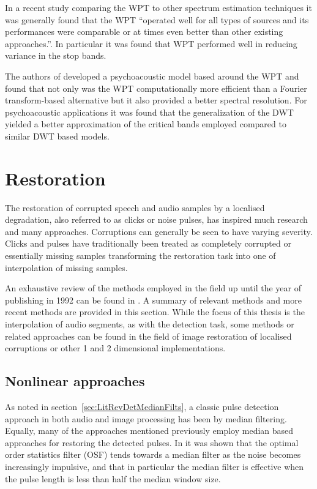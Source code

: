 In a recent study comparing the WPT to other spectrum estimation techniques it was generally found that the WPT ``operated well for all types of sources and its performances were comparable or at times even better than other existing \linebreak[0]approaches.''\cite{Ariananda2013}. In particular it was found that WPT performed well in reducing variance in the stop bands.

The authors of \cite{He2008} developed a psychoacoustic model based around the WPT and found that not only was the WPT computationally more efficient than a Fourier transform-based alternative but it also provided a better spectral resolution. For psychoacoustic applications it was found that the generalization of the DWT yielded a better approximation of the critical bands employed\cite{Carnero1999}\cite{He2008} compared to similar DWT based models\cite{Sinha1993}\cite{Zurera2001}.

\section{Restoration}\label{sec:LitRev_Restoration}
The restoration of corrupted speech and audio samples by a localised degradation, also referred to as clicks or noise pulses, has inspired much research and many approaches. Corruptions can generally be seen to have varying severity. Clicks and pulses have traditionally been treated as completely corrupted or essentially missing samples transforming the restoration task into one of interpolation of missing samples\cite{Tukey1974}\cite{Tukey1977}\cite{Godsill1998book}.

An exhaustive review of the methods employed in the field up until the year of publishing in 1992 can be found in \cite{Veldhuis1992}. A summary of relevant methods and more recent methods are provided in this section. While the focus of this thesis is the interpolation of audio segments, as with the detection task, some methods or related approaches can be found in the field of image restoration of localised corruptions or other 1 and 2 dimensional implementations.

\subsection{Nonlinear approaches}\label{sec:LitRev_RestorationNonLin}
As noted in section~\ref{sec:LitRevDetMedianFilts}, a classic pulse detection approach in both audio and image processing has been by median filtering. Equally, many of the approaches mentioned previously employ median based approaches for restoring the detected pulses\cite{Tukey1974}\cite{Lee1985}\cite{Heinonen1985}\cite{Heinonen1987}\cite{Maekivirta1991}\cite{Kasparis1993}\cite{Alajlan2004}. In \cite{Bovik1983} it was shown that the optimal order statistics filter (OSF) tends towards a median filter as the noise becomes increasingly impulsive, and that in particular the median filter is effective when the pulse length is less than half the median window size\cite{Alajlan2004}.

